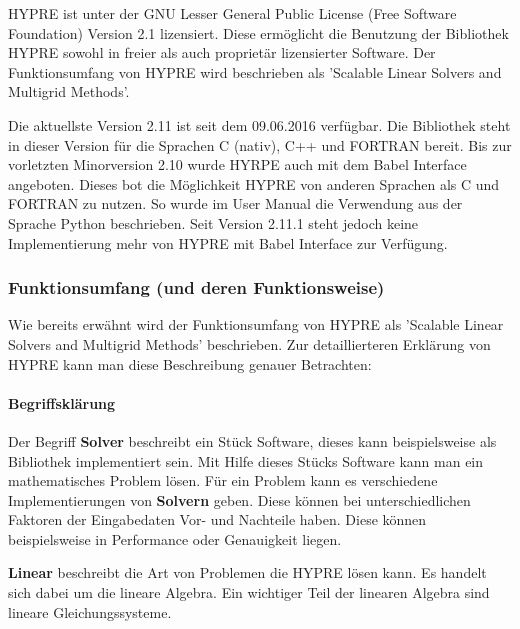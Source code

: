 \documentclass[a4paper,10pt]{article}
\begin{document}
HYPRE ist unter der GNU Lesser General Public License (Free Software Foundation) Version 2.1 lizensiert.
Diese ermöglicht die Benutzung der Bibliothek HYPRE sowohl in freier als auch proprietär lizensierter Software.
Der Funktionsumfang von HYPRE wird beschrieben als 'Scalable Linear Solvers and Multigrid Methods'.

Die aktuellste Version 2.11 ist seit dem 09.06.2016 verfügbar.
Die Bibliothek steht in dieser Version für die Sprachen C (nativ), C++ und FORTRAN bereit.
Bis zur vorletzten Minorversion 2.10 wurde HYRPE auch mit dem Babel Interface angeboten.
Dieses bot die Möglichkeit HYPRE von anderen Sprachen als C und FORTRAN zu nutzen.
So wurde im User Manual die Verwendung aus der Sprache Python beschrieben.
Seit Version 2.11.1 steht jedoch keine Implementierung mehr von HYPRE mit Babel Interface zur Verfügung.

\subsubsection{Funktionsumfang (und deren Funktionsweise)}

Wie bereits erwähnt wird der Funktionsumfang von HYPRE als 'Scalable Linear Solvers and Multigrid Methods' beschrieben.
Zur detaillierteren Erklärung von HYPRE kann man diese Beschreibung genauer Betrachten:

\paragraph{Begriffsklärung}

Der Begriff \textbf{Solver} beschreibt ein Stück Software, dieses kann beispielsweise als Bibliothek implementiert sein.
Mit Hilfe dieses Stücks Software kann man ein mathematisches Problem lösen.
Für ein Problem kann es verschiedene Implementierungen von \textbf{Solvern} geben.
Diese können bei unterschiedlichen Faktoren der Eingabedaten Vor- und Nachteile haben.
Diese können beispielsweise in Performance oder Genauigkeit liegen.

\textbf{Linear} beschreibt die Art von Problemen die HYPRE lösen kann.
Es handelt sich dabei um die lineare Algebra.
Ein wichtiger Teil der linearen Algebra sind lineare Gleichungssysteme.
\end{document}
